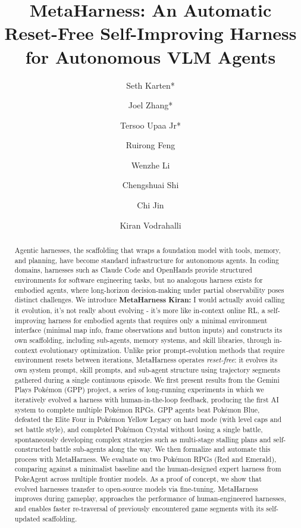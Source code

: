 \documentclass{article} %
\title{MetaHarness: An Automatic Reset-Free Self-Improving Harness for Autonomous VLM Agents}
\author{
Seth Karten*  \and
Joel Zhang* \and
Tersoo Upaa Jr* \and
Ruirong Feng \and
Wenzhe Li \and
Chengshuai Shi \and
Chi Jin \and
Kiran Vodrahalli
}
\newcommand{\kiran}[1]{{\color{green}\textbf{Kiran:} #1}}
\begin{document}
\ifcolmsubmission
\linenumbers
\fi

\maketitle

\begin{abstract}
Agentic harnesses, the scaffolding that wraps a foundation model with tools, memory, and planning, have become standard infrastructure for autonomous agents. In coding domains, harnesses such as Claude Code and OpenHands provide structured environments for software engineering tasks, but no analogous harness exists for embodied agents, where long-horizon decision-making under partial observability poses distinct challenges. We introduce \textbf{MetaHarness} \kiran{I would actually avoid calling it evolution, it's not really about evolving - it's more like in-context online RL}, a self-improving harness for embodied agents that requires only a minimal environment interface (minimal map info, frame observations and button inputs) and constructs its own scaffolding, including sub-agents, memory systems, and skill libraries, through in-context evolutionary optimization. Unlike prior prompt-evolution methods that require environment resets between iterations, MetaHarness operates \emph{reset-free}: it evolves its own system prompt, skill prompts, and sub-agent structure using trajectory segments gathered during a single continuous episode. We first present results from the Gemini Plays Pokémon (GPP) project, a series of long-running experiments in which we iteratively evolved a harness with human-in-the-loop feedback, producing the first AI system to complete multiple Pokémon RPGs. GPP agents beat Pokémon Blue, defeated the Elite Four in Pokémon Yellow Legacy on hard mode (with level caps and set battle style), and completed Pokémon Crystal without losing a single battle, spontaneously developing complex strategies such as multi-stage stalling plans and self-constructed battle sub-agents along the way. We then formalize and automate this process with MetaHarness. We evaluate on two Pokémon RPGs (Red and Emerald), comparing against a minimalist baseline and the human-designed expert harness from PokeAgent across multiple frontier models. As a proof of concept, we show that evolved harnesses transfer to open-source models via fine-tuning. MetaHarness improves during gameplay, approaches the performance of human-engineered harnesses, and enables faster re-traversal of previously encountered game segments with its self-updated scaffolding.
\end{abstract}
\end{document}
